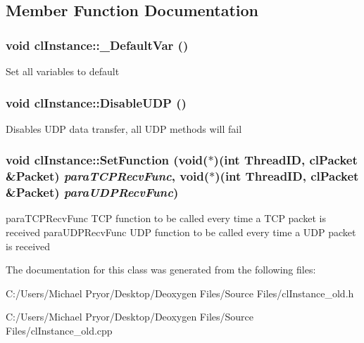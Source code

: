 \subsection{Member Function Documentation}
\hypertarget{classcl_instance_a747b51442108bac2e3d62fa718d8037b}{
\subsubsection[{\_\-DefaultVar}]{\setlength{\rightskip}{0pt plus 5cm}void clInstance::\_\-DefaultVar ()}}
\label{classcl_instance_a747b51442108bac2e3d62fa718d8037b}
Set all variables to default \hypertarget{classcl_instance_a4f908b49d9b10bad89d1349bf7e202ed}{
\subsubsection[{DisableUDP}]{\setlength{\rightskip}{0pt plus 5cm}void clInstance::DisableUDP ()}}
\label{classcl_instance_a4f908b49d9b10bad89d1349bf7e202ed}
Disables UDP data transfer, all UDP methods will fail \hypertarget{classcl_instance_a1ab07f3683546a1bc64d14042336baaf}{
\subsubsection[{SetFunction}]{\setlength{\rightskip}{0pt plus 5cm}void clInstance::SetFunction (void($\ast$)(int ThreadID, {\bf clPacket} \&Packet) {\em paraTCPRecvFunc}, \/  void($\ast$)(int ThreadID, {\bf clPacket} \&Packet) {\em paraUDPRecvFunc})}}
\label{classcl_instance_a1ab07f3683546a1bc64d14042336baaf}
paraTCPRecvFunc TCP function to be called every time a TCP packet is received paraUDPRecvFunc UDP function to be called every time a UDP packet is received 

The documentation for this class was generated from the following files:\begin{DoxyCompactItemize}
\item 
C:/Users/Michael Pryor/Desktop/Deoxygen Files/Source Files/clInstance\_\-old.h\item 
C:/Users/Michael Pryor/Desktop/Deoxygen Files/Source Files/clInstance\_\-old.cpp\end{DoxyCompactItemize}
